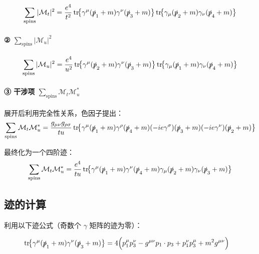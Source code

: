 \begin{equation}
    \sum_{\mathrm{spins}} |\mathcal{M}_t|^2
    = \frac{e^4}{t^2}
    \operatorname{tr}\!\bigl\{\gamma^\mu (\slashed{p}_1 + m)\gamma^\nu (\slashed{p}_3 + m)\bigr\}
    \operatorname{tr}\!\bigl\{\gamma_\mu (\slashed{p}_2 + m)\gamma_\nu (\slashed{p}_4 + m)\bigr\}
\end{equation}

\paragraph{② $\sum_{\mathrm{spins}} |\mathcal{M}_u|^2$}

\begin{equation}
    \sum_{\mathrm{spins}} |\mathcal{M}_u|^2
    = \frac{e^4}{u^2}
    \operatorname{tr}\!\bigl\{\gamma^\mu (\slashed{p}_2 + m)\gamma^\nu (\slashed{p}_3 + m)\bigr\}
    \operatorname{tr}\!\bigl\{\gamma_\mu (\slashed{p}_1 + m)\gamma_\nu (\slashed{p}_4 + m)\bigr\}
\end{equation}

\paragraph{③ 干涉项 $\sum_{\mathrm{spins}} \mathcal{M}_t \mathcal{M}_u^*$}

展开后利用完全性关系，色因子提出：
\begin{equation}
    \sum_{\mathrm{spins}} \mathcal{M}_t \mathcal{M}_u^*
    = \frac{g_{\mu\nu} g_{\rho\sigma}}{tu}
    \operatorname{tr}\!\bigl\{\gamma^\mu (\slashed{p}_1 + m)\gamma^\rho (\slashed{p}_4 + m)
    (-ie\gamma^\sigma)(\slashed{p}_3 + m)(-ie\gamma^\nu)(\slashed{p}_2 + m)\bigr\}
\end{equation}

最终化为一个四阶迹：
\begin{equation}
    \sum_{\mathrm{spins}} \mathcal{M}_t \mathcal{M}_u^*
    = \frac{e^4}{tu}
    \operatorname{tr}\!\bigl\{\gamma^\mu (\slashed{p}_1 + m)\gamma^\nu (\slashed{p}_4 + m)
    \gamma_\mu (\slashed{p}_2 + m)\gamma_\nu (\slashed{p}_3 + m)\bigr\}
\end{equation}

\subsection*{迹的计算}

利用以下迹公式（奇数个 $\gamma$ 矩阵的迹为零）：

\begin{align}
    \operatorname{tr}\!\bigl\{\gamma^\mu (\slashed{p}_1 + m)\gamma^\nu (\slashed{p}_3 + m)\bigr\}
    &= 4\Bigl(p_1^\mu p_3^\nu - g^{\mu\nu} p_1 \cdot p_3 + p_1^\nu p_3^\mu + m^2 g^{\mu\nu}\Bigr)
\end{align}

